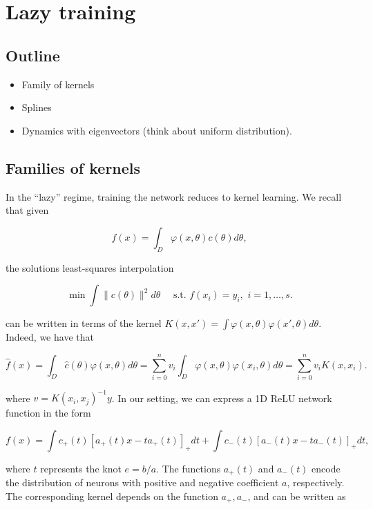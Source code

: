 \section{Lazy training}
\subsection{Outline}
\begin{itemize}
    \item Family of kernels 
    \item Splines
    \item Dynamics with eigenvectors (think about uniform distribution).
\end{itemize}

\subsection{Families of kernels}

In the ``lazy'' regime, training the network reduces to kernel learning. We recall that given

\begin{equation}
f(x) = \int_D \varphi(x,\theta) c(\theta) d\theta,
\end{equation}

the solutions least-squares interpolation

\begin{equation}\label{eq:4-1-min}
\min \int \|c(\theta)\|^2 d\theta \quad \mbox{ s.t. } f(x_i) = y_i, \,\, i=1,\ldots,s.
\end{equation}

can be written in terms of the kernel $K(x,x') = \int \varphi(x,\theta) \varphi(x',\theta) d\theta$. Indeed, we have that 

\begin{equation}
    \hat f(x) = \int_D \hat c(\theta) \varphi(x,\theta) d\theta = \sum_{i=0}^n v_i \int_D \varphi(x,\theta)\varphi(x_i,\theta) d\theta = \sum_{i=0}^n v_i K(x,x_i).
\end{equation}

where $v = K(x_i,x_j)^{-1} y$. In our setting, we can express a 1D ReLU network function in the form

\begin{equation}
f(x) = \int c_+(t)[a_+(t) x - ta_+(t)]_+ dt + \int c_-(t)[a_-(t) x - ta_-(t)]_+ dt,
\end{equation}

where $t$ represents the knot $e = b/a$. The functions $a_+(t)$ and $a_{-}(t)$ encode the distribution of neurons
with positive and negative coefficient $a$, respectively. The corresponding kernel depends on the function $a_+,a_-$, and can be written as


